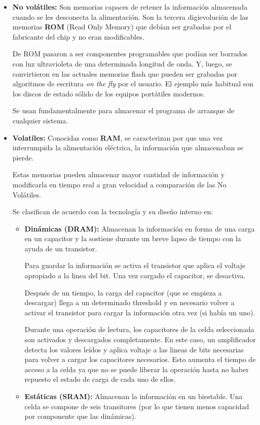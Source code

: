 \begin{itemize}
	\item \textbf{No volátiles:} Son memorias capaces de retener la información almacenada cuando se les desconecta la alimentación. Son la tercera digievolución de las memorias \textbf{ROM} (Read Only Memory) que debían ser grabadas por el fabricante del chip y no eran modificables.
	
	De ROM pasaron a ser componentes programables que podían ser borrados con luz ultravioleta de una determinada longitud de onda. Y, luego, se convirtieron en las actuales memorias flash que pueden ser grabadas por algoritmos de escritura \textit{on the fly} por el usuario. El ejemplo más habitual son los discos de estado sólido de los equipos portátiles modernos.
	
	Se usan fundamentalmente para almacenar el programa de arranque de cualquier sistema.
	
	\item\textbf{Volatiles:} Conocidas como \textbf{RAM}, se caracterizan por que una vez interrumpida la alimentación eléctrica, la información que almacenaban se pierde.
	
	Estas memorias pueden almacenar mayor cantidad de información y modificarla en tiempo real a gran velocidad a comparación de las No Volátiles.
	
	Se clasifican de acuerdo con la tecnología y su diseño interno en:
	
	\begin{itemize}
		\item \textbf{Dinámicas (DRAM):} Almacenan la información en forma de una carga en un capacitor y la sostiene durante un breve lapso de tiempo con la ayuda de un transistor.
		
		Para guardar la información se activa el transistor que aplica el voltaje apropiado a la linea del bit. Una vez cargado el capacitor, se desactiva. 
		
		Después de un tiempo, la carga del capacitor (que se empieza a descargar) llega a un determinado threshold y en necesario volver a activar el transistor para cargar la información otra vez (si había un uno).
		
		Durante una operación de lectura, los capacitores de la celda seleccionada son activados y descargados completamente. En este caso, un amplificador detecta los valores leídos y aplica voltaje a las lineas de bits necesarias para volver a cargar
 		los capacitores necesarios. Esto aumenta el tiempo de acceso a la celda ya que no se puede liberar la operación hasta no haber repuesto el estado de carga de cada uno de ellos.
 		\item \textbf{Estáticas (SRAM):} Almacenan la información en un biestable. Una celda se compone de seis transitores (por lo que tienen menos capacidad por componente que las dinámicas).
 		

\end{itemize}
\end{itemize}
